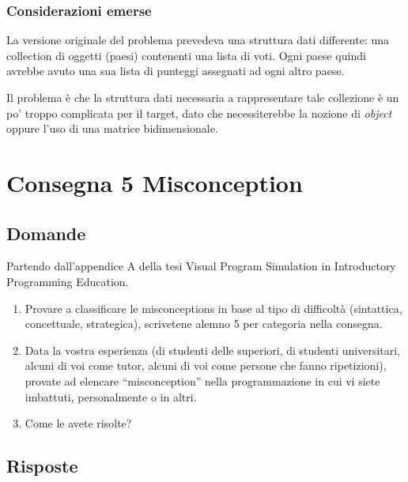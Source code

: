 \documentclass[a4paper]{article}
\begin{document}
\subsubsection{Considerazioni emerse}
La versione originale del problema prevedeva una struttura dati differente: una collection di oggetti (paesi) contenenti una lista di voti.
Ogni paese quindi avrebbe avuto una sua lista di punteggi assegnati ad ogni altro paese.

Il problema è che la struttura dati necessaria a rappresentare tale collezione è un po' troppo complicata per il target, dato che necessiterebbe la nozione di \textit{object} oppure l'uso di una matrice bidimensionale.
\section{Consegna 5 \large Misconception}

\subsection{Domande}
Partendo dall'appendice A della  tesi Visual Program Simulation in Introductory Programming Education.

\begin{enumerate}

	\item Provare a classificare le misconceptions in base al tipo di  difficoltà (sintattica, concettuale, strategica), scrivetene alemno 5 per categoria nella consegna.
	\item Data la vostra esperienza (di studenti delle superiori, di studenti universitari, alcuni di voi come tutor, alcuni di voi come persone che fanno ripetizioni), provate ad elencare “misconception” nella programmazione in cui vi siete imbattuti, personalmente o in altri.
	\item Come le avete risolte?
\end{enumerate}
\subsection{Risposte}
\end{document}
